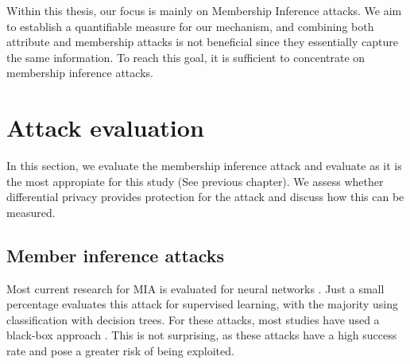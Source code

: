 Within this thesis, our focus is mainly on Membership Inference attacks.
We aim to establish a quantifiable measure for our mechanism, and combining both attribute and membership attacks is not beneficial since they essentially capture the same information.
To reach this goal, it is sufficient to concentrate on membership inference attacks. %
\newpage






\section{Attack evaluation} \label{theory:attack-evaluation}
In this section, we evaluate the membership inference attack and evaluate as it is the most appropiate for this study (See previous chapter).
We assess whether differential privacy provides protection for the attack and discuss how this can be measured.
\subsection{Member inference attacks}
Most current research for MIA is evaluated for neural networks \citep{rigaki_survey_2021}.
Just a small percentage evaluates this attack for supervised learning, with the majority using classification with decision trees.
For these attacks, most studies have used a black-box approach \citep{rigaki_survey_2021}.
This is not surprising, as these attacks have a high success rate and pose a greater risk of being exploited.

